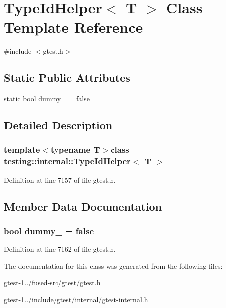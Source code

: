 \hypertarget{classtesting_1_1internal_1_1TypeIdHelper}{\section{\-Type\-Id\-Helper$<$ \-T $>$ \-Class \-Template \-Reference}
\label{dd/d88/classtesting_1_1internal_1_1TypeIdHelper}
}


{\ttfamily \#include $<$gtest.\-h$>$}

\subsection*{\-Static \-Public \-Attributes}
\begin{DoxyCompactItemize}
\item 
static bool \hyperlink{classtesting_1_1internal_1_1TypeIdHelper_a870ada1c63895a920259b24a83260232}{dummy\-\_\-} = false
\end{DoxyCompactItemize}


\subsection{\-Detailed \-Description}
\subsubsection*{template$<$typename T$>$class testing\-::internal\-::\-Type\-Id\-Helper$<$ T $>$}



\-Definition at line 7157 of file gtest.\-h.



\subsection{\-Member \-Data \-Documentation}
\hypertarget{classtesting_1_1internal_1_1TypeIdHelper_a870ada1c63895a920259b24a83260232}{
\subsubsection[{dummy\-\_\-}]{\setlength{\rightskip}{0pt plus 5cm}bool {\bf dummy\-\_\-} = false}}\label{dd/d88/classtesting_1_1internal_1_1TypeIdHelper_a870ada1c63895a920259b24a83260232}


\-Definition at line 7162 of file gtest.\-h.



\-The documentation for this class was generated from the following files\-:\begin{DoxyCompactItemize}
\item 
gtest-\/1../fused-\/src/gtest/\hyperlink{fused-src_2gtest_2gtest_8h}{gtest.\-h}\item 
gtest-\/1../include/gtest/internal/\hyperlink{gtest-internal_8h}{gtest-\/internal.\-h}\end{DoxyCompactItemize}
